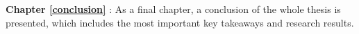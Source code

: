 \textbf{Chapter \ref{conclusion} }:
As a final chapter, a conclusion of the whole thesis is presented,
which includes the most important key takeaways and research results.










%


%
%

